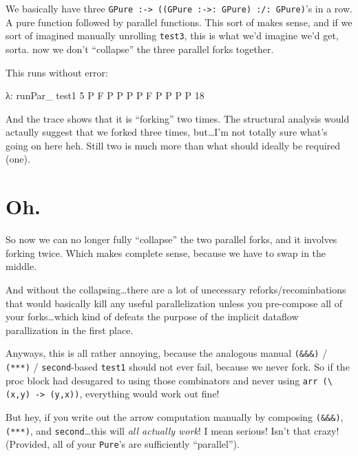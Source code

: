 \documentclass[]{article}
\newenvironment{Shaded}{}{}
\newcommand{\DataTypeTok}[1]{\textcolor[rgb]{0.56,0.13,0.00}{{#1}}}
\newcommand{\DecValTok}[1]{\textcolor[rgb]{0.25,0.63,0.44}{{#1}}}
\newcommand{\FunctionTok}[1]{\textcolor[rgb]{0.02,0.16,0.49}{{#1}}}
\newcommand{\NormalTok}[1]{{#1}}
\begin{document}
We basically have three
\texttt{GPure\ :-\textgreater{}\ ((GPure\ :-\textgreater{}:\ GPure)\ :/:\ GPure)}'s
in a row. A pure function followed by parallel functions. This sort of
makes sense, and if we sort of imagined manually unrolling
\texttt{test3}, this is what we'd imagine we'd get, sorta. now we don't
``collapse'' the three parallel forks together.

This runs without error:

\begin{Shaded}
\begin{Highlighting}[]
\NormalTok{λ}\FunctionTok{:} \NormalTok{runPar_ test1 }\DecValTok{5}
\DataTypeTok{P}
\DataTypeTok{F}
\DataTypeTok{P}
\DataTypeTok{P}
\DataTypeTok{P}
\DataTypeTok{P}
\DataTypeTok{F}
\DataTypeTok{P}
\DataTypeTok{P}
\DataTypeTok{P}
\DataTypeTok{P}
\DecValTok{18}
\end{Highlighting}
\end{Shaded}

And the trace shows that it is ``forking'' two times. The structural
analysis would actaully suggest that we forked three times,
but\ldots{}I'm not totally sure what's going on here heh. Still two is
much more than what should ideally be required (one).

\section{Oh.}\label{oh.}

So now we can no longer fully ``collapse'' the two parallel forks, and
it involves forking twice. Which makes complete sense, because we have
to swap in the middle.

And without the collapsing\ldots{}there are a lot of unecessary
reforks/recominbations that would basically kill any useful
parallelization unless you pre-compose all of your forks\ldots{}which
kind of defeats the purpose of the implicit dataflow parallization in
the first place.

Anyways, this is all rather annoying, because the analogous manual
\texttt{(\&\&\&)} / \texttt{(***)} / \texttt{second}-based
\texttt{test1} should not ever fail, because we never fork. So if the
proc block had desugared to using those combinators and never using
\texttt{arr\ (\textbackslash{}(x,y)\ -\textgreater{}\ (y,x))},
everything would work out fine!

But hey, if you write out the arrow computation manually by composing
\texttt{(\&\&\&)}, \texttt{(***)}, and \texttt{second}\ldots{}this will
\emph{all actually work}! I mean serious! Isn't that crazy! (Provided,
all of your \texttt{Pure}'s are sufficiently ``parallel'').
\end{document}
